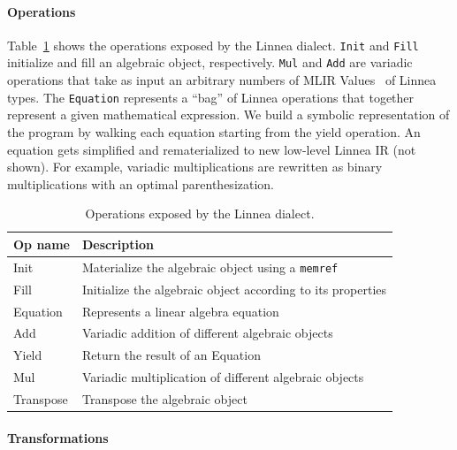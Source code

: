 \documentclass[conference]{IEEEtran}
\begin{document}
\paragraph{Operations} \label{par:operation}
Table~\ref{table:operations} shows the operations exposed by the Linnea
dialect. \texttt{Init} and \texttt{Fill} initialize and
fill an algebraic object, respectively. \texttt{Mul} and \texttt{Add} are
variadic operations that take as input an arbitrary numbers of MLIR Values~\cite{ValueMLIR} of
Linnea types.  The \texttt{Equation} represents a ``bag'' of Linnea operations
that together represent a given mathematical expression. We build a symbolic
representation of the program by walking each equation starting from the yield
operation. An equation gets simplified and rematerialized to new low-level
Linnea IR (not shown).  For example, variadic multiplications are  rewritten as binary
multiplications with an optimal parenthesization. 

\begin{table}
\begin{center}
\begin{tabular}{ll}
    \toprule
    \footnotesize{Op name}     & \footnotesize{Description} \\ \midrule
    \footnotesize{Init} & \footnotesize{Materialize the algebraic object using a \texttt{memref}} \\
    \rowcolor{aluminium1}
    \footnotesize{Fill} & \footnotesize{Initialize the algebraic object according to its properties}  \\
    \footnotesize{Equation} & \footnotesize{Represents a linear algebra equation} \\
    \rowcolor{aluminium1}
    \footnotesize{Add} & \footnotesize{Variadic addition of different algebraic objects} \\ 
    \footnotesize{Yield} & \footnotesize{Return the result of an Equation} \\
    \rowcolor{aluminium1}
    \footnotesize{Mul} & \footnotesize{Variadic multiplication of different algebraic objects} \\ 
    \footnotesize{Transpose} & \footnotesize {Transpose the algebraic object} \\ \bottomrule
\end{tabular}
\end{center}
\caption{Operations exposed by the Linnea dialect.}
\label{table:operations}
\end{table} 

\paragraph{Transformations}
\end{document}
